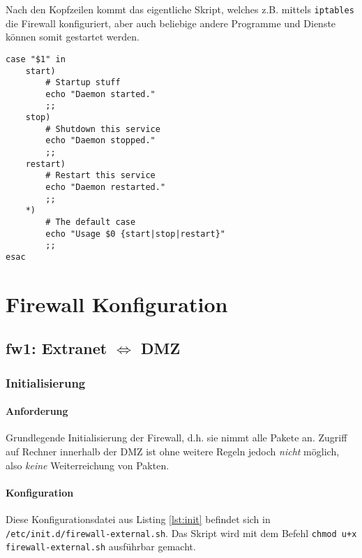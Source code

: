 Nach den Kopfzeilen kommt das eigentliche Skript, welches z.B. mittels
{\tt iptables} die Firewall konfiguriert, aber auch beliebige andere Programme
und Dienste können somit gestartet werden.

\begin{lstlisting}[label=lst:lsb-script,caption={Init Script LSB: Eigentliches Skript.}]
case "$1" in
    start)
        # Startup stuff
        echo "Daemon started."
        ;;
    stop)
        # Shutdown this service
        echo "Daemon stopped."
        ;;
    restart)
        # Restart this service
        echo "Daemon restarted."
        ;;
    *)
        # The default case
        echo "Usage $0 {start|stop|restart}"
        ;;
esac
\end{lstlisting}

\section{Firewall Konfiguration}

\subsection{fw1: Extranet $\Longleftrightarrow$ DMZ}

\subsubsection{Initialisierung}

\paragraph{Anforderung} Grundlegende Initialisierung der Firewall, d.h.
sie nimmt alle Pakete an. Zugriff auf Rechner innerhalb der DMZ ist ohne
weitere Regeln jedoch \emph{nicht} möglich, also \emph{keine} Weiterreichung von
Pakten.

\paragraph{Konfiguration} Diese Konfigurationsdatei aus Listing \ref{lst:init}
befindet sich in {\tt /etc/init.d/firewall-external.sh}.
Das Skript wird mit dem Befehl {\tt chmod u+x firewall-external.sh}
ausführbar gemacht.

